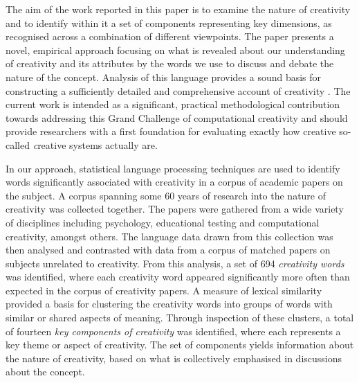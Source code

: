 \documentclass[10pt,letterpaper]{article}
\begin{document}
The aim of the work reported in this paper is to examine the nature of creativity and to identify within it a set of components representing key dimensions, as recognised across a combination of different viewpoints. The paper presents a novel, empirical approach focusing on what is revealed about our understanding of creativity and its attributes by the words we use to discuss and debate the nature of the concept. Analysis of this language provides a sound basis for constructing a sufficiently detailed and comprehensive account of creativity \cite{lakoff87,wittgenstein58}. The current work is intended as a significant, practical methodological contribution towards addressing this Grand Challenge of computational creativity and should provide researchers with a first foundation for evaluating exactly how creative so-called {\emph creative systems} actually are.

In our approach, statistical language processing techniques are used to identify words significantly associated with creativity in a corpus of academic papers on the subject. A corpus spanning some 60 years of research into the nature of creativity was collected together. The papers were gathered from a wide variety of disciplines including psychology, educational testing and computational creativity, amongst others. The language data drawn from this collection was then analysed and contrasted with data from a corpus of matched papers on subjects unrelated to creativity. From this analysis, a set of 694 {\em creativity words\/} was identified, where each creativity word appeared significantly more often than expected in the corpus of creativity papers. A measure of lexical similarity provided a basis for clustering the creativity words into groups of words with similar or shared aspects of meaning. Through inspection of these clusters, a total of fourteen {\em key components of creativity\/} was identified, where each represents a key theme or aspect of creativity. The set of components yields information about the nature of creativity, based on what is collectively emphasised in discussions about the concept. 

\end{document}
